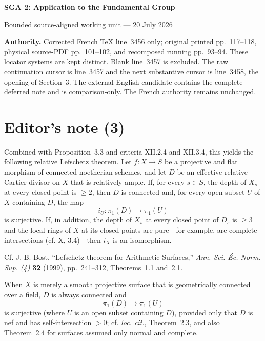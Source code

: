 \documentclass[10pt,a4paper]{article}
\begin{document}
\begin{center}
  {\Large\bfseries SGA 2: Application to the Fundamental Group}\par\smallskip
  {\large Bounded source-aligned working unit --- 20 July 2026}
\end{center}

\noindent\colorbox{softgray}{\parbox{0.95\linewidth}{\footnotesize\textbf{Authority.}
Corrected French TeX line~3456 only; original printed pp.~117--118,
physical source-PDF pp.~101--102, and recomposed running pp.~93--94. These
locator systems are kept distinct. Blank line~3457 is excluded. The raw
continuation cursor is line~3457 and the next substantive cursor is line~3458,
the opening of Section~3. The external English candidate contains the complete
deferred note and is comparison-only. The French authority remains unchanged.}}

\section*{Editor's note (3)}
Combined with Proposition~3.3 and criteria XII.2.4 and XII.3.4, this yields the
following relative Lefschetz theorem. Let $f\colon X\to S$ be a projective and
flat morphism of connected noetherian schemes, and let $D$ be an effective
relative Cartier divisor on $X$ that is relatively ample. If, for every
$s\in S$, the depth of $X_s$ at every closed point is $\geq 2$, then $D$ is
connected and, for every open subset $U$ of $X$ containing $D$, the map
\[
  i_U\colon \pi_1(D)\longrightarrow\pi_1(U)
\]
is surjective. If, in addition, the depth of $X_s$ at every closed point of
$D_s$ is $\geq 3$ and the local rings of $X$ at its closed points are
pure---for example, are complete intersections (cf. X, 3.4)---then $i_X$ is an
isomorphism.

Cf. J.-B. Bost, ``Lefschetz theorem for Arithmetic Surfaces,''
\emph{Ann. Sci. \'Ec. Norm. Sup. (4)} \textbf{32} (1999), pp.~241--312,
Theorems~1.1 and~2.1.

When $X$ is merely a smooth projective surface that is geometrically connected
over a field, $D$ is always connected and
\[
  \pi_1(D)\longrightarrow\pi_1(U)
\]
is surjective (where $U$ is an open subset containing $D$), provided only that
$D$ is nef and has self-intersection $>0$; cf. \emph{loc. cit.}, Theorem~2.3,
and also Theorem~2.4 for surfaces assumed only normal and complete.
\end{document}
